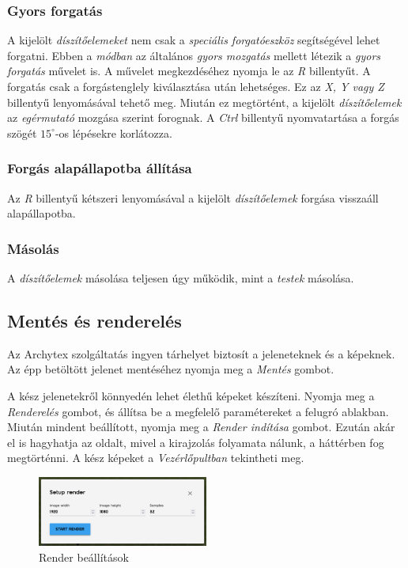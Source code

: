 \subsubsection{Gyors forgatás}

A kijelölt \emph{díszítőelemeket} nem csak a \emph{speciális forgatóeszköz} segítségével lehet
forgatni. Ebben a \emph{módban} az általános \emph{gyors mozgatás} mellett létezik a
\emph{gyors forgatás} művelet is. A művelet megkezdéséhez nyomja le az \emph{R} billentyűt.
A forgatás csak a forgástenglely kiválasztása után lehetséges. Ez
az \emph{X, Y vagy Z} billentyű lenyomásával tehető meg. Miután ez megtörtént, a kijelölt
\emph{díszítőelemek} az \emph{egérmutató} mozgása szerint forognak. A \emph{Ctrl} billentyű
nyomvatartása a forgás szögét $15^{\circ}$-os lépésekre korlátozza.

\subsubsection{Forgás alapállapotba állítása}

Az \emph{R} billentyű kétszeri lenyomásával a kijelölt \emph{díszítőelemek} forgása visszaáll
alapállapotba.

\subsubsection{Másolás}

A \emph{díszítőelemek} másolása teljesen úgy működik, mint a \emph{testek} másolása.

\subsection{Mentés és renderelés}

Az Archytex szolgáltatás ingyen tárhelyet biztosít a jeleneteknek és a képeknek. Az épp betöltött
jelenet mentéséhez nyomja meg a \emph{Mentés} gombot.

A kész jelenetekről könnyedén lehet élethű képeket készíteni. Nyomja meg a \emph{Renderelés} gombot,
és állítsa be a megfelelő paramétereket a felugró ablakban. Miután mindent beállított, nyomja meg
a \emph{Render indítása} gombot. Ezután akár el is hagyhatja az oldalt, mivel a kirajzolás
folyamata nálunk, a háttérben fog megtörténni. A kész képeket a \emph{Vezérlőpultban} tekintheti
meg.

\begin{figure}[h]
    \centering
    \includegraphics[width=0.5\textwidth]{parts/user-documentation/editor/images/render.png}
    \caption{Render beállítások}
\end{figure}